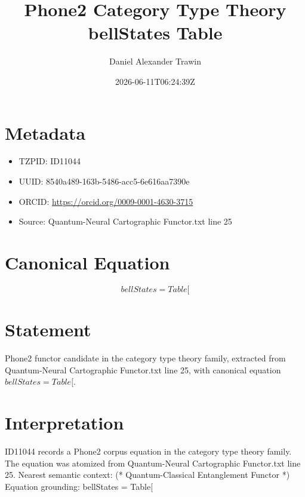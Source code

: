 \documentclass[11pt]{article}
\title{Phone2 Category Type Theory bellStates Table}
\author{Daniel Alexander Trawin}
\date{2026-06-11T06:24:39Z}
\begin{document}
\maketitle
\section*{Metadata}
\begin{itemize}
\item TZPID: ID11044
\item UUID: 8540a489-163b-5486-acc5-6e616aa7390e
\item ORCID: \url{https://orcid.org/0009-0001-4630-3715}
\item Source: Quantum-Neural Cartographic Functor.txt line 25
\end{itemize}
\section*{Canonical Equation}
\[
bellStates = Table[
\]
\section*{Statement}
Phone2 functor candidate in the category type theory family, extracted from Quantum-Neural Cartographic Functor.txt line 25, with canonical equation $bellStates = Table[$.
\section*{Interpretation}
ID11044 records a Phone2 corpus equation in the category type theory family. The equation was atomized from Quantum-Neural Cartographic Functor.txt line 25. Nearest semantic context: (* Quantum-Classical Entanglement Functor *) Equation grounding: bellStates = Table[
\end{document}
